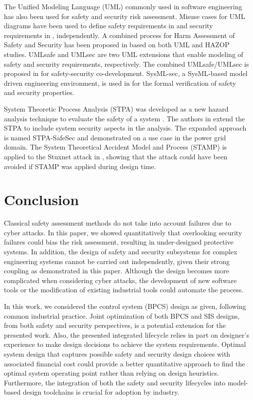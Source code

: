 \documentclass[journal]{IEEEtran}
\begin{document}
The Unified Modeling Language (UML) commonly used in software engineering has also been used for safety and security risk assessment. Misuse cases for UML diagrams have been used to define safety requirements in \cite{Sindre2007} and security requirements in \cite{Sindre2005}, independently. A combined process for Harm Assessment of Safety and Security has been proposed in \cite{Raspotnig2012} based on both UML and HAZOP studies. UMLsafe \cite{Jurjens2003} and UMLsec \cite{Jurjens2002} are two UML extensions that enable modeling of safety and security requirements, respectively. The combined UMLsafe/UMLsec is proposed in \cite{Jurjens2003a} for safety-security co-development. SysML-sec, a SysML-based model driven engineering environment, is used in \cite{Pedroza2011} for the formal verification of safety and security properties.

System Theoretic Process Analysis (STPA) was developed as a new hazard analysis technique to evaluate the safety of a system \cite{Thomas2013}. The authors in \cite{Friedberg2017} extend the STPA to include system security aspects in the analysis. The expanded approach is named STPA-SafeSec and demonstrated on a use case in the power grid domain. The System Theoretical Accident Model and Process (STAMP) is applied to the Stuxnet attack in \cite{Nourian2018AStuxnet}, showing that the attack could have been avoided if STAMP was applied during design time.


\section{Conclusion} \label{sec:conclusion}
Classical safety assessment methods do not take into account failures due to cyber attacks. In this paper, we showed quantitatively that overlooking security failures could bias the risk assessment, resulting in under-designed protective systems. In addition, the design of safety and security subsystems for complex engineering systems cannot be carried out independently, given their strong coupling as demonstrated in this paper. Although the design becomes more complicated when considering cyber attacks, the development of new software tools or the modification of existing industrial tools could automate the process.

In this work, we considered the control system (BPCS) design as given, following common industrial practice. Joint optimization of both BPCS and SIS designs, from both safety and security perspectives, is a potential extension for the presented work. Also, the presented integrated lifecycle relies in part on designer's experience to make design decisions to achieve the system requirements. Optimal system design that captures possible safety and security design choices with associated financial cost could provide a better quantitative approach to find the optimal system operating point rather than relying on design heuristics. Furthermore, the integration of both the safety and security lifecycles into model-based design toolchains is crucial for adoption by industry.
\end{document}
